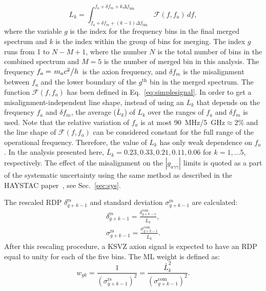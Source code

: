 \documentclass[%
reprint, %
superscriptaddress,
 amsmath,amssymb,
 aps
]{revtex4-2}
\begin{document}
\begin{equation}
  \label{eq:Lq_integral}
  L_{k} = \int_{f_a +\delta f_m + (k-1)\Delta f_\text{bin}}^{f_a +\delta f_m + k\Delta f_\text{bin}} \mathcal{F}(f,f_a) \,df,
\end{equation}
where the variable $g$ is the index for the frequency bins in 
the final merged spectrum and 
$k$ is the index within the group of bins for 
merging. The index $g$ runs from 1 to $N-M+1$, where 
the number $N$ is the total number of bins in 
the combined spectrum and $M=5$ is the number of 
merged bin in this analysis. 
The frequency $f_a=\left.m_a c^2\middle/h\right.$ is the axion
frequency, and $\delta f_m$ is the misalignment between $f_a$ and the lower
boundary of the $g^\text{th}$ bin in the merged spectrum.
The function $\mathcal{F}(f,f_a)$ has been defined in 
Eq.~\eqref{eq:simplesignal}.
In order to get a misalignment-independent line shape, instead of using an
$L_{k}$ that depends on the frequency $f_a$ and  $\delta f_m$, the average 
($\bar{L}_{k}$) of $L_{k}$ over the ranges of $f_a$ and $\delta f_m$ is 
used. 
Note that the relative variation of $f_a$ is at most 
90~MHz/5~GHz$\approx2\%$ and the line shape of $\mathcal{F}(f,f_a)$ 
can be considered constant for the full range of the operational 
frequency. Therefore, 
the value of $L_{k}$ has only weak dependence on $f_a$. 
In the analysis presented here, 
$\bar{L}_{k} = 0.23, 0.33, 0.21, 0.11, 0.06$ for $k = 1, ... 5$, respectively.
The effect of the misalignment on the $\left|g_{a\gamma\gamma}\right|$ limits 
is quoted as a part of the systematic uncertainty using the same method as 
described in the HAYSTAC paper~\cite{HAYSTACII}, see Sec.~\ref{sec:sys}.

The rescaled RDP $\delta^\text{rs}_{g+k-1}$ and
standard deviation $\sigma^\text{rs}_{g+k-1}$ are calculated:
\begin{equation}
  \label{eq:rescaled_delta_sigma_com}
  \begin{split}
  \delta^\text{rs}_{g+k-1} = \frac{\delta^\text{com}_{g+k-1}}{\bar{L}_{k}},\\
  \sigma^\text{rs}_{g+k-1} = \frac{\sigma^\text{com}_{g+k-1}}{\bar{L}_{k}}.
  \end{split}
\end{equation}
After this rescaling procedure, a KSVZ axion signal is expected to have an 
RDP equal to unity for each of the five bins. The ML weight is defined as: 
\begin{equation}
    \label{eq:merge_weight}
    w_{gk} = \frac{1}{(\sigma_{g+k-1}^\text{rs})^{2}} = \frac{\bar{L}_{k}^{2}}{(\sigma_{g+k-1}^\text{com})^{2}}.
\end{equation}
\end{document}
